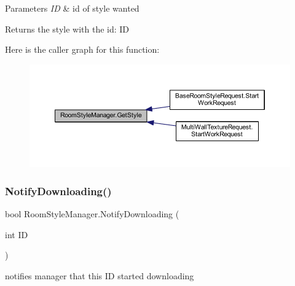 \begin{DoxyParams}{Parameters}
{\em ID} & id of style wanted\\
\hline
\end{DoxyParams}
\begin{DoxyReturn}{Returns}
the style with the id\+: ID
\end{DoxyReturn}
Here is the caller graph for this function\+:
\nopagebreak
\begin{figure}[H]
\begin{center}
\leavevmode
\includegraphics[width=350pt]{class_room_style_manager_acc946bc24833e24565dee0cdc3b2ef44_icgraph}
\end{center}
\end{figure}
\mbox{\label{class_room_style_manager_a3d3f5a2cb6e861577d01b015c30c3d9a}} 
\subsubsection{\texorpdfstring{Notify\+Downloading()}{NotifyDownloading()}}
{\footnotesize\ttfamily bool Room\+Style\+Manager.\+Notify\+Downloading (\begin{DoxyParamCaption}\item[{int}]{ID }\end{DoxyParamCaption})}



notifies manager that this ID started downloading 


